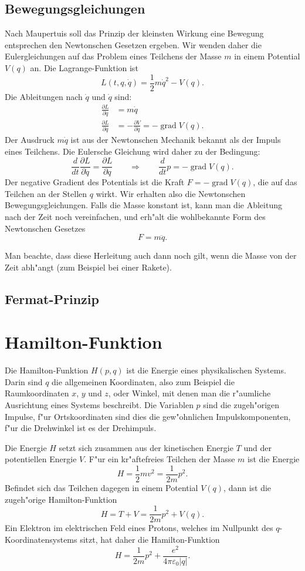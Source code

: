 \subsection{Bewegungsgleichungen}
Nach Maupertuis soll das Prinzip der kleinsten Wirkung eine Bewegung
entsprechen den Newtonschen Gesetzen ergeben.
Wir wenden daher die Eulergleichungen auf das Problem eines Teilchens der
Masse $m$ in einem Potential $V(q)$ an. Die Lagrange-Funktion ist
\[
L(t, q, \dot q)=\frac12m\dot q^2-V(q).
\]
Die Ableitungen nach $\dot q$ und $\dot q$ sind:
\begin{align*}
\frac{\partial L}{\partial \dot q}&=m\dot q\\
\frac{\partial L}{\partial q}&=-\frac{\partial V}{\partial q}=-\operatorname{grad}V(q).
\end{align*}
Der Ausdruck $m\dot q$ ist aus der Newtonschen Mechanik bekannt als
der Impuls eines Teilchens. Die Eulersche Gleichung wird daher zu
der Bedingung:
\[
\frac{d}{dt}\frac{\partial L}{\partial \dot q}=\frac{\partial L}{\partial q}
\qquad\Rightarrow\qquad
\frac{d}{dt}p=-\operatorname{grad}V(q).
\]
Der negative Gradient des Potentials ist die Kraft $F=-\operatorname{grad}V(q)$,
die auf das Teilchen an der Stellen $q$ wirkt.
Wir erhalten also die Newtonschen Bewegungsgleichungen.
Falls die Masse konstant ist, kann man die Ableitung nach der Zeit
noch vereinfachen, und erh"alt die wohlbekannte Form des Newtonschen
Gesetzes
\[
F= m\ddot q.
\]

Man beachte, dass diese Herleitung auch dann noch gilt, wenn die Masse von der
Zeit abh"angt (zum Beispiel bei einer Rakete).

\subsection{Fermat-Prinzip}

\section{Hamilton-Funktion}
Die Hamilton-Funktion $H(p,q)$ ist die Energie eines physikalischen
Systems. Darin sind $q$ die allgemeinen Koordinaten, also
zum Beispiel die Raumkoordinaten $x$, $y$ und $z$, oder Winkel, mit
denen man die r"aumliche Ausrichtung eines Systems beschreibt.
Die Variablen $p$ sind die zugeh"origen Impulse, f"ur Ortskoordinaten
sind dies die gew"ohnlichen Impulskomponenten, f"ur die Drehwinkel ist
es der Drehimpuls.

Die Energie $H$ setzt sich zusammen aus der kinetischen Energie $T$ und der
potentiellen Energie $V$. F"ur ein kr"aftefreies Teilchen der Masse $m$
ist die Energie 
\[
H=\frac12mv^2=\frac1{2m}p^2.
\]
Befindet sich das Teilchen dagegen in einem Potential $V(q)$, dann 
ist die zugeh"orige Hamilton-Funktion
\begin{equation}
H=T+V=\frac1{2m}p^2+V(q).
\label{hamilton-potential}
\end{equation}
Ein Elektron im elektrischen Feld eines Protons, welches im Nullpunkt
des $q$-Koordinatensystems sitzt, hat daher die Hamilton-Funktion
\[
H=\frac1{2m}p^2+\frac{e^2}{4\pi\varepsilon_0|q|}.
\]

